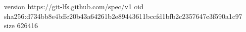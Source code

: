 version https://git-lfs.github.com/spec/v1
oid sha256:d734bb8e4bffc20b43a64261b2e89443611bccfd1bfb2c2357647c3f590a1c97
size 626416
